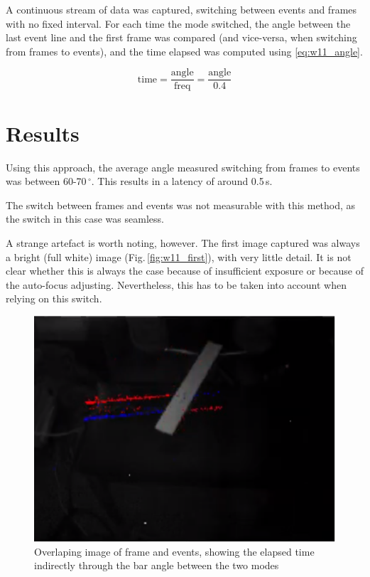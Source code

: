 \documentclass[10pt,twocolumn]{IEEEtran}
\begin{document}
A continuous stream of data was captured, switching between events and frames with no fixed interval. For each time the mode switched, the angle between the last event line and the first frame was compared (and vice-versa, when switching from frames to events), and the time elapsed was computed using \eqref{eq:w11_angle}.

\begin{equation}
    \label{eq:w11_angle}
    \text{time} = \frac{\text{angle}}{\text{freq}} = \frac{\text{angle}}{0.4}
\end{equation}

\section{Results}

Using this approach, the average angle measured switching from frames to events was between 60-70\,$^{\circ}$. This results in a latency of around 0.5\,s. 

The switch between frames and events was not measurable with this method, as the switch in this case was seamless. 

A strange artefact is worth noting, however. The first image captured was always a bright (full white) image (Fig.\,\ref{fig:w11_first}), with very little detail. It is not clear whether this is always the case because of insufficient exposure or because of the auto-focus adjusting. Nevertheless, this has to be taken into account when relying on this switch.

\begin{figure}[ht]
    \centering
    \includegraphics[width = 0.8\linewidth]{overlap.png}
    \caption{Overlaping image of frame and events, showing the elapsed time indirectly through the bar angle between the two modes}
    \label{fig:w11_setup}
\end{figure}
\end{document}
